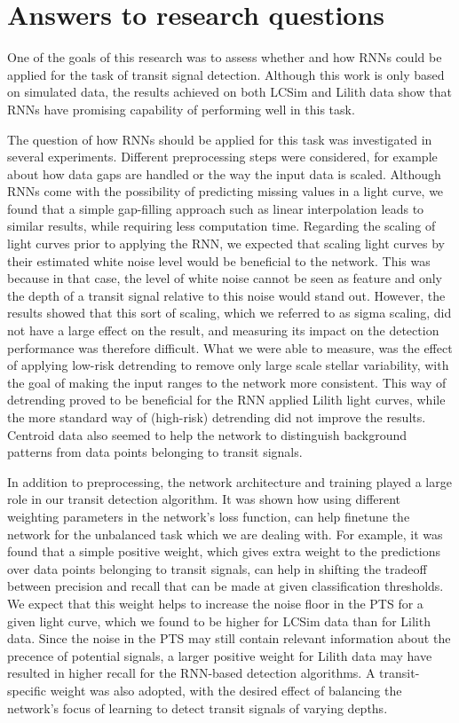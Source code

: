 
\section{Answers to research questions}

One of the goals of this research was to assess whether and how RNNs could be applied for the task of transit signal detection. Although this work is only based on simulated data, the results achieved on both LCSim and Lilith data show that RNNs have promising capability of performing well in this task. 

The question of how RNNs should be applied for this task was investigated in several experiments. Different preprocessing steps were considered, for example about how data gaps are handled or the way the input data is scaled. Although RNNs come with the possibility of predicting missing values in a light curve, we found that a simple gap-filling approach such as linear interpolation leads to similar results, while requiring less computation time. Regarding the scaling of light curves prior to applying the RNN, we expected that scaling light curves by their estimated white noise level would be beneficial to the network. This was because in that case, the level of white noise cannot be seen as feature and only the depth of a transit signal relative to this noise would stand out. However, the results showed that this sort of scaling, which we referred to as sigma scaling, did not have a large effect on the result, and measuring its impact on the detection performance was therefore difficult. What we were able to measure, was the effect of applying low-risk detrending to remove only large scale stellar variability, with the goal of making the input ranges to the network more consistent. This way of detrending proved to be beneficial for the RNN applied Lilith light curves, while the more standard way of (high-risk) detrending did not improve the results. Centroid data also seemed to help the network to distinguish background patterns from data points belonging to transit signals.

In addition to preprocessing, the network architecture and training played a large role in our transit detection algorithm. It was shown how using different weighting parameters in the network's loss function, can help finetune the network for the unbalanced task which we are dealing with. For example, it was found that a simple positive weight, which gives extra weight to the predictions over data points belonging to transit signals, can help in shifting the tradeoff between precision and recall that can be made at given classification thresholds. We expect that this weight helps to increase the noise floor in the PTS for a given light curve, which we found to be higher for LCSim data than for Lilith data. Since the noise in the PTS may still contain relevant information about the precence of potential signals, a larger positive weight for Lilith data may have resulted in higher recall for the RNN-based detection algorithms. A transit-specific weight was also adopted, with the desired effect of balancing the network's focus of learning to detect transit signals of varying depths. 

